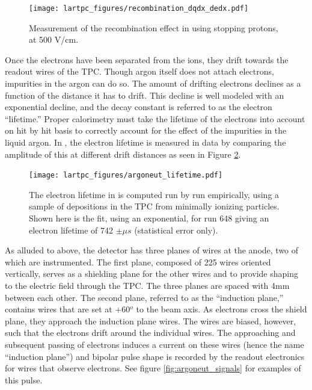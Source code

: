 \begin{figure}[h]
  \centering
  \texttt{[image: lartpc\_figures/recombination\_dqdx\_dedx.pdf]}
  \caption[\argoneut Recombination]{Measurement of the recombination effect in \argoneut using stopping protons, at 500 V/cm. \cite{Acciarri:2013met}}
  \label{fig:argoneut_recombination}
\end{figure}

Once the electrons have been separated from the ions, they drift towards the readout wires of the TPC.  Though argon itself does not attach electrons, impurities in the argon can do so.  The amount of drifting electrons declines as a function of the distance it has to drift.  This decline is well modeled with an exponential decline, and the decay constant is referred to as the electron ``lifetime.'' Proper calorimetry must take the lifetime of the electrons into account on hit by hit basis to correctly account for the effect of the impurities in the liquid argon.  In \argoneut, the electron lifetime is measured in data by comparing the amplitude of this at different drift distances as seen in Figure \ref{fig:argoneut_lifetime}.

\begin{figure}[h]
  \centering
  \texttt{[image: lartpc\_figures/argoneut\_lifetime.pdf]}
  \caption[\argoneut Lifetime Measurement]{The electron lifetime in \argoneut is computed run by run empirically, using a sample of depositions in the TPC from minimally ionizing particles.  Shown here is the fit, using an exponential, for run 648 giving an electron lifetime of 742 $\pm \mu s$ (statistical error only).}
  \label{fig:argoneut_lifetime}
\end{figure}


As alluded to above, the \argoneut detector has three planes of wires at the anode, two of which are instrumented.  The first plane, composed of 225 wires oriented vertically, serves as a shielding plane for the other wires and to provide shaping to the electric field through the TPC.  The three planes are spaced with 4mm between each other.  The second plane, referred to as the ``induction plane,'' contains wires that are set at +60$^o$ to the beam axis.  As electrons cross the shield plane, they approach the induction plane wires.  The wires are biased, however, such that the electrons drift around the individual wires.  The approaching and subsequent passing of electrons induces a current on these wires (hence the name ``induction plane'') and bipolar pulse shape is recorded by the readout electronics for wires that observe electrons.  See figure \ref{fig:argoneut_signals} for examples of this pulse.

